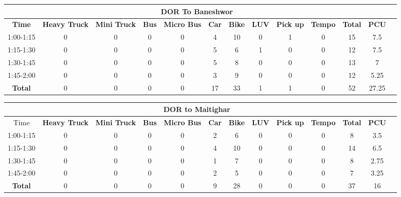 \begin{landscape}
\centering
\begin{table}[h!]
\centering
\begin{tabular}{|c|c|c|c|c|c|c|c|c|c|c|c|c|}
    \hline
    \multicolumn{12}{|c|}{\textbf{DOR To Baneshwor}} \\
    \hline
    \textbf{Time} & \textbf{Heavy Truck} & \textbf{Mini Truck} & \textbf{Bus} & \textbf{Micro Bus} & \textbf{Car} & \textbf{Bike} & \textbf{LUV} & \textbf{Pick up} & \textbf{Tempo} & \textbf{\textbf{Total}} & \textbf{PCU} \\
    \hline
1:00-1:15	&0	&0	&0	&0	&4	&10	&0	&1	&0	&15	&7.5 \\ \hline
1:15-1:30	&0	&0	&0	&0	&5	&6	&1	&0	&0	&12	&7.5 \\ \hline
1:30-1:45	&0	&0	&0	&0	&5	&8	&0	&0	&0	&13	&7 \\ \hline
1:45-2:00	&0	&0	&0	&0	&3	&9	&0	&0	&0	&12	&5.25 \\ \hline
\textbf{Total}	&0	&0	&0	&0	&17	&33	&1	&1	&0	&52	&27.25 \\ \hline

\end{tabular}

\vspace{0.5cm}

\begin{tabular}{|c|c|c|c|c|c|c|c|c|c|c|c|c|}
    \hline
    \multicolumn{12}{|c|}{\textbf{DOR to Maitighar}} \\
    \hline
        Time & \textbf{Heavy Truck} & \textbf{Mini Truck} & \textbf{Bus} & \textbf{Micro Bus} & \textbf{Car} & \textbf{Bike} & \textbf{LUV} & \textbf{Pick up} & \textbf{Tempo} & \textbf{\textbf{Total}} & \textbf{PCU} \\
    \hline
1:00-1:15	&0	&0	&0	&0	&2	&6	&0	&0	&0	&8	&3.5 \\ \hline
1:15-1:30	&0	&0	&0	&0	&4	&10	&0	&0	&0	&14	&6.5 \\ \hline
1:30-1:45	&0	&0	&0	&0	&1	&7	&0	&0	&0	&8	&2.75 \\ \hline
1:45-2:00	&0	&0	&0	&0	&2	&5	&0	&0	&0	&7	&3.25 \\ \hline
\textbf{Total}	&0	&0	&0	&0	&9	&28	&0	&0	&0	&37	&16 \\ \hline



\end{tabular}


\end{table}
\end{landscape}

